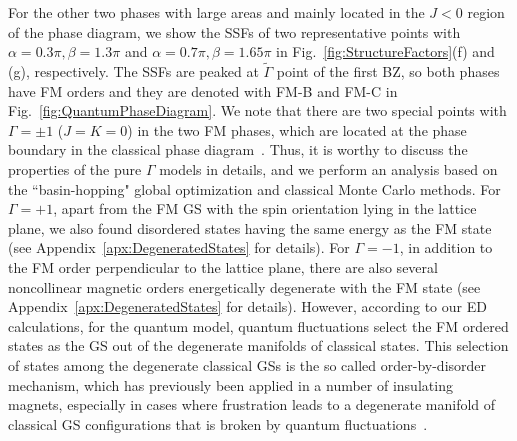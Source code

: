 \documentclass[aps,prb,reprint,amsfonts,amsmath,amssymb,showpacs,groupedaddress,superscriptaddress]{revtex4-1}
\begin{document}
For the other two phases with large areas and mainly located in the $J<0$ region of the phase diagram, we show the SSFs of two representative points with $\alpha=0.3\pi, \beta=1.3\pi$ and $\alpha=0.7\pi, \beta=1.65\pi$ in Fig.~\ref{fig:StructureFactors}(f) and (g), respectively. The SSFs are peaked at $\tilde{\Gamma}$ point of the first BZ, so both phases have FM orders and they are denoted with FM-B and FM-C in Fig.~\ref{fig:QuantumPhaseDiagram}. We note that there are two special points with $\Gamma=\pm1$ ($J=K=0$) in the two FM phases, which are located at the phase boundary in the classical phase diagram~\cite{PhysRevB.92.165108}. Thus, it is worthy to discuss the properties of the pure $\Gamma$ models in details, and we perform an analysis based on the ``basin-hopping" global optimization and classical Monte Carlo methods. For $\Gamma=+1$, apart from the FM GS with the spin orientation lying in the lattice plane, we also found disordered states having the same energy as the FM state (see Appendix~\ref{apx:DegeneratedStates} for details). For $\Gamma=-1$, in addition to the FM order perpendicular to the lattice plane, there are also several noncollinear magnetic orders energetically degenerate with the FM state (see Appendix~\ref{apx:DegeneratedStates} for details). However, according to our ED calculations, for the quantum model, quantum fluctuations select the FM ordered states as the GS out of the degenerate manifolds of classical states. This selection of states among the degenerate classical GSs is the so called order-by-disorder mechanism, which has previously been applied in a number of insulating magnets, especially in cases where frustration leads to a degenerate manifold of classical GS configurations that is broken by quantum fluctuations~\cite{JPSJ.54.4494,PhysRevLett.62.2056,PhysRevLett.88.067203,PhysRevB.81.214419,PhysRevLett.109.077204}.
\end{document}
